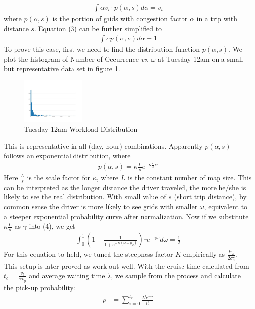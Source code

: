 \documentclass[letterpaper, 10 pt, conference]{ieeeconf}
\begin{document}
\begin{enumerate}
\begin{align}
\int \alpha v_t\cdot p(\alpha, s)d\alpha = v_t
\end{align}
where $p(\alpha, s)$ is the portion of grids with congestion factor $\alpha$ in a trip with distance $s$. Equation (3) can be further simplified to
\begin{align}
\int \alpha p(\alpha, s)d\alpha = 1
\end{align}
To prove this case, first we need to find the distribution function $p(\alpha,s)$. We plot the histogram of Number of Occurrence \textit{vs.} $\omega$ at Tuesday 12am on a small but representative data set in figure 1. 
\begin{figure}
\caption{Tuesday 12am Workload Distribution}
\centering
\includegraphics[width=0.28\textwidth]{0am-busy.jpeg}
\end{figure}
This is representative in all (day, hour) combinations. Apparently $p(\alpha, s)$ follows an exponential distribution, where
\begin{align}
p(\alpha, s) = \kappa\frac{L}{s}e^{-\kappa\frac{L}{s}\alpha}
\end{align}
Here $\frac{L}{s}$ is the scale factor for $\kappa$, where $L$ is the constant number of map size. This can be interpreted as the longer distance the driver traveled, the more he/she is likely to see the real distribution. With small value of $s$ (short trip distance), by common sense the driver is more likely to see grids with smaller $\omega$, equivalent to a steeper exponential probability curve after normalization. Now if we substitute $\kappa\frac{L}{s}$ as $\gamma$ into (4), we get 
\begin{align}
\int_{0}^{1}(1-\frac{1}{1+e^{-K(\omega-\mu_\omega)}})\gamma e^{-\gamma\omega}d\omega = \frac{1}{2}
\end{align}
For this equation to hold, we tuned the steepness factor $K$ empirically as $\frac{\mu_\omega}{2\sigma_\omega^2}$. This setup is later proved as work out well.
With the cruise time calculated from $t_c = \frac{v_t}{\alpha v_g}$ and average waiting time $\lambda$, we sample from the process and calculate the pick-up probability:
\begin{align}
p &= \sum_{i=0}^{t_c}\frac{\lambda^ie^{-\lambda}}{i!}

\end{align}
\end{enumerate}
\end{document}
